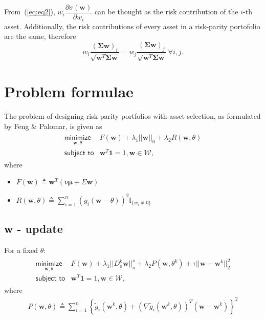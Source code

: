 \documentclass{article}
\begin{document}
From~(\ref{eq:eq2}), $w_{i}\dfrac{\partial \sigma(\bm{w})}{\partial w_i}$ can be
thought as the risk contribution of the $i$-th asset. Additionally, the risk
contributions of every asset in a risk-parity portofolio are the same, therefore
\begin{equation}
w_i \dfrac{(\bm{\Sigma}{\bm{w}})_{i}}{\sqrt{\bm{w}^{T}\bm{\Sigma}\bm{w}}} =
w_j \dfrac{(\bm{\Sigma}{\bm{w}})_{j}}{\sqrt{\bm{w}^{T}\bm{\Sigma}\bm{w}}}~\forall i, j.
\end{equation}

\section{Problem formulae}
The problem of designing risk-parity portfolios with asset selection, as formulated by Feng \& Palomar,
is given as
\begin{align}\begin{array}{ll}
\underset{\bm{w}, \theta}{\textsf{minimize}} & F(\bm{w}) + \lambda_{1}||\bm{w}||_{0} + \lambda_{2}R(\bm{w}, \theta)\\
\textsf{subject to} & \bm{w}^{T}\bm{1} = 1, \bm{w} \in \mathcal{W},
\end{array}\end{align}
where
\begin{itemize}
    \item $F(\bm{w}) \triangleq \bm{w}^{T}(\nu \bm{\mu} + \Sigma\bm{w})$
    \item $R(\bm{w}, \theta) \triangleq \sum_{i=1}^{n}(g_i(\bm{w} - \theta))^{2}\mathbb{I}_{\{w_i \neq 0\}}$
\end{itemize}

\subsection{w - update}
For a fixed $\theta$:
\begin{align}\begin{array}{ll}
\underset{\bm{w}, \theta}{\textsf{minimize}} & F(\bm{w}) + \lambda_{1}||D^{k}_{o}\bm{w}||^{o}_{o} +
\lambda_{2}P(\bm{w}, \theta^{k}) + \tau ||\bm{w} - \bm{w}^{k}||^{2}_{2}\\
\textsf{subject to} & \bm{w}^{T}\bm{1} = 1, \bm{w} \in \mathcal{W},
\end{array}\end{align}
where
\begin{align}
P(\bm{w}, \theta) \triangleq \sum^{n}_{i=1}\left\{\tilde{g}_{i}(\bm{w}^{k}, \theta) +
                  (\nabla\tilde{g}_{i}(\bm{w}^{k}, \theta))^{T}(\bm{w} - \bm{w}^{k})\right\}^{2}
\end{align}
\end{document}
